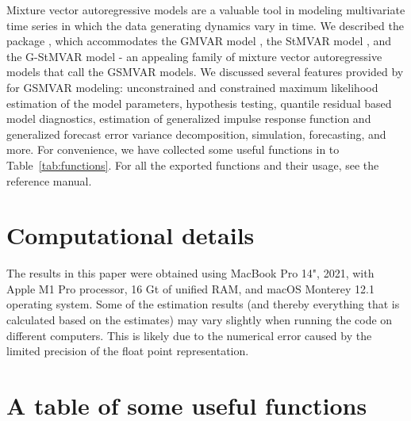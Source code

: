 \documentclass[nojss]{jss}
\begin{document}
Mixture vector autoregressive models are a valuable tool in modeling multivariate time series in which the data generating dynamics vary in time. We described the  package , which accommodates the GMVAR model \citep{Kalliovirta+Meitz+Saikkonen:2016}, the StMVAR model \citep{Virolainen2:2021}, and the G-StMVAR model \citep{Virolainen2:2021} - an appealing family of mixture vector autoregressive models that call the GSMVAR models. We discussed several features provided by  for GSMVAR modeling: unconstrained and constrained maximum likelihood estimation of the model parameters, hypothesis testing, quantile residual based model diagnostics, estimation of generalized impulse response function and generalized forecast error variance decomposition, simulation, forecasting, and more. For convenience, we have collected some useful functions in  to Table~\ref{tab:functions}. For all the exported functions and their usage, see the reference manual.


\section*{Computational details}

The results in this paper were obtained using MacBook Pro 14", 2021, with Apple M1 Pro processor, 16 Gt of unified RAM, and macOS Monterey 12.1 operating system. Some of the estimation results (and thereby everything that is calculated based on the estimates) may vary slightly when running the code on different computers. This is likely due to the numerical error caused by the limited precision of the float point representation.


\cleardoublepage
\section*{A table of some useful functions}\label{sec:table}
\end{document}
